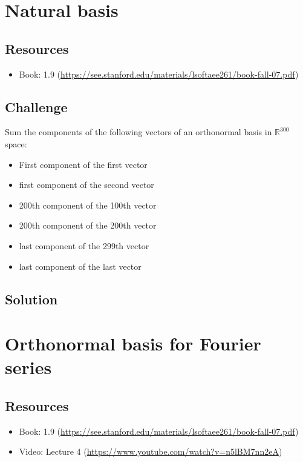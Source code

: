 \newpage
\section{Natural basis}

\subsection*{Resources}
\begin{itemize}
    \item Book: 1.9 (\url{https://see.stanford.edu/materials/lsoftaee261/book-fall-07.pdf})
\end{itemize}

\subsection*{Challenge}
Sum the components of the following vectors of an orthonormal basis in $\mathbb{R}^{300}$ space:

\begin{itemize}
    \item First component of the first vector
    \item first component of the second vector
    \item 200th component of the 100th vector
    \item 200th component of the 200th vector
    \item last component of the 299th vector
    \item last component of the last vector
\end{itemize}

\subsection*{Solution}




\newpage
\section{Orthonormal basis for Fourier series}

\subsection*{Resources}
\begin{itemize}
    \item Book: 1.9 (\url{https://see.stanford.edu/materials/lsoftaee261/book-fall-07.pdf})
    \item Video: Lecture 4 (\url{https://www.youtube.com/watch?v=n5lBM7nn2eA})
\end{itemize}

